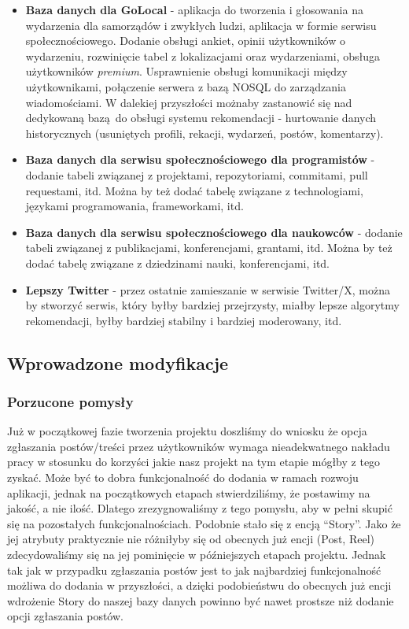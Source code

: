\documentclass{article}
\begin{document}
\begin{itemize}
  \item \textbf{Baza danych dla GoLocal} - aplikacja do tworzenia i głosowania na wydarzenia dla samorządów i zwykłych ludzi, aplikacja w formie serwisu społecznościowego. Dodanie obsługi ankiet, opinii użytkowników o wydarzeniu, rozwinięcie tabel z lokalizacjami oraz wydarzeniami, obsługa użytkowników \textit{premium}. Usprawnienie obsługi komunikacji między użytkownikami, połączenie serwera z bazą NOSQL do zarządzania wiadomościami. W dalekiej przyszłości możnaby zastanowić się nad dedykowaną bazą do obsługi systemu rekomendacji - hurtowanie danych historycznych (usuniętych profili, rekacji, wydarzeń, postów, komentarzy). 
    \item \textbf{Baza danych dla serwisu społecznościowego dla programistów} - dodanie tabeli związanej z projektami, repozytoriami, commitami, pull requestami, itd. Można by też dodać tabelę związane z technologiami, językami programowania, frameworkami, itd.
    \item \textbf{Baza danych dla serwisu społecznościowego dla naukowców} - dodanie tabeli związanej z publikacjami, konferencjami, grantami, itd. Można by też dodać tabelę związane z dziedzinami nauki, konferencjami, itd.
    \item \textbf{Lepszy Twitter} - przez ostatnie zamieszanie w serwisie Twitter/X, można by stworzyć serwis, który byłby bardziej przejrzysty, miałby lepsze algorytmy rekomendacji, byłby bardziej stabilny i bardziej moderowany, itd.
\end{itemize}

\subsection{Wprowadzone modyfikacje}

\subsubsection{Porzucone pomysły}
Już w początkowej fazie tworzenia projektu doszliśmy do wniosku że opcja zgłaszania postów/treści przez użytkowników wymaga nieadekwatnego nakładu pracy w stosunku do korzyści jakie nasz projekt na tym etapie mógłby z tego zyskać. Może być to dobra funkcjonalność do dodania w ramach rozwoju aplikacji, jednak na początkowych etapach stwierdziliśmy, że postawimy na jakość, a nie ilość. Dlatego zrezygnowaliśmy z tego pomysłu, aby w pełni skupić się na pozostałych funkcjonalnościach. 
Podobnie stało się z encją “Story”. Jako że jej atrybuty praktycznie nie różniłyby się od obecnych już encji (Post, Reel) zdecydowaliśmy się na jej pominięcie w późniejszych etapach projektu. Jednak tak jak w przypadku zgłaszania postów jest to jak najbardziej funkcjonalność możliwa do dodania w przyszłości, a dzięki podobieństwu do obecnych już encji wdrożenie Story do naszej bazy danych powinno być nawet prostsze niż dodanie opcji zgłaszania postów. 
\end{document}
